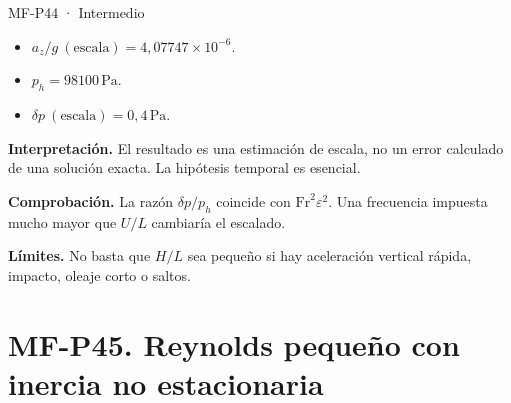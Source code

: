 \begin{studiumworked}{MF-P44 · Intermedio}
\begin{itemize}
\item $a_z/g\ \mathrm{(escala)}=4{,}07747\times10^{-6}$.

\item $p_h=98100\,\mathrm{Pa}$.

\item $\delta p\ \mathrm{(escala)}=0{,}4\,\mathrm{Pa}$.

\end{itemize}

\textbf{Interpretación.} El resultado es una estimación de escala, no un error calculado de una solución exacta. La hipótesis temporal es esencial.

\textbf{Comprobación.} La razón $\delta p/p_h$ coincide con $\mathrm{Fr}^2\varepsilon^2$. Una frecuencia impuesta mucho mayor que $U/L$ cambiaría el escalado.

\textbf{Límites.} No basta que $H/L$ sea pequeño si hay aceleración vertical rápida, impacto, oleaje corto o saltos.

\end{studiumworked}



\Needspace{.30\textheight}\section{MF-P45. Reynolds pequeño con inercia no estacionaria}

